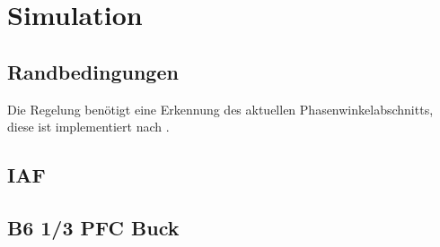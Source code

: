 \chapter{Simulation}

\section{Randbedingungen}

Die Regelung benötigt eine Erkennung des aktuellen Phasenwinkelabschnitts, diese ist implementiert nach \cite{InstituteofElectricalandElectronicsEngineers}.

\section{IAF}

\cite{IAF99}


\section{B6 1/3 PFC Buck}